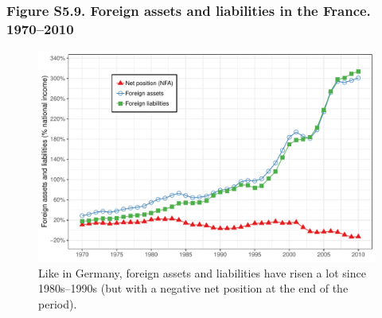 \documentclass[t]{beamer}\usepackage[]{graphicx}\usepackage[]{color}
\makeatletter
\def\maxwidth{ %
  \ifdim\Gin@nat@width>\linewidth
    \linewidth
  \else
    \Gin@nat@width
  \fi
}
\newenvironment{knitrout}{}{} %
\makeatother
\begin{document}
\begin{frame}[label=Figure_S5_9]
\frametitle{Figure S5.9. Foreign assets and liabilities in the France. 1970--2010}
\begin{figure}[t]
\begin{minipage}[b]{\textwidth}
\centering
\begin{knitrout}\footnotesize
{}\color{fgcolor}

{\centering \includegraphics[width=\maxwidth]{figures/color/Figure_S5_9} 

}



\end{knitrout}
\caption{Like in Germany, foreign assets and liabilities have risen a lot since 1980s--1990s (but with a negative net position at the end of the period).}
\end{minipage}
\end{figure}
\end{frame}
\end{document}
